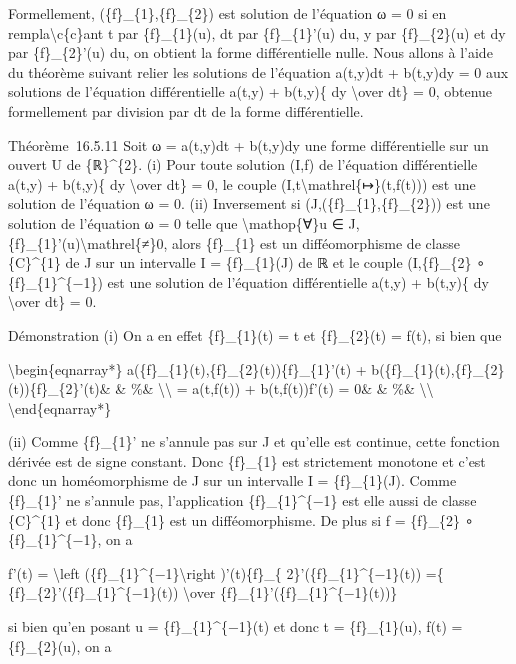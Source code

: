 \documentclass[]{article}
\begin{document}
Formellement, (\{f\}\_\{1\},\{f\}\_\{2\}) est solution de l'équation ω =
0 si en rempla\textbackslash{}c\{c\}ant t par \{f\}\_\{1\}(u), dt par
\{f\}\_\{1\}'(u) du, y par \{f\}\_\{2\}(u) et dy par \{f\}\_\{2\}'(u)
du, on obtient la forme différentielle nulle. Nous allons à l'aide du
théorème suivant relier les solutions de l'équation a(t,y)dt + b(t,y)dy
= 0 aux solutions de l'équation différentielle a(t,y) + b(t,y)\{ dy
\textbackslash{}over dt\} = 0, obtenue formellement par division par dt
de la forme différentielle.

Théorème~16.5.11 Soit ω = a(t,y)dt + b(t,y)dy une forme différentielle
sur un ouvert U de \{ℝ\}\^{}\{2\}. (i) Pour toute solution (I,f) de
l'équation différentielle a(t,y) + b(t,y)\{ dy \textbackslash{}over dt\}
= 0, le couple (I,t\textbackslash{}mathrel\{↦\}(t,f(t))) est une
solution de l'équation ω = 0. (ii) Inversement si
(J,(\{f\}\_\{1\},\{f\}\_\{2\})) est une solution de l'équation ω = 0
telle que \textbackslash{}mathop\{∀\}u ∈
J,\{f\}\_\{1\}'(u)\textbackslash{}mathrel\{≠\}0, alors \{f\}\_\{1\} est
un difféomorphisme de classe \{C\}\^{}\{1\} de J sur un intervalle I =
\{f\}\_\{1\}(J) de ℝ et le couple (I,\{f\}\_\{2\} ∘
\{f\}\_\{1\}\^{}\{−1\}) est une solution de l'équation différentielle
a(t,y) + b(t,y)\{ dy \textbackslash{}over dt\} = 0.

Démonstration (i) On a en effet \{f\}\_\{1\}(t) = t et \{f\}\_\{2\}(t) =
f(t), si bien que

\textbackslash{}begin\{eqnarray*\}
a(\{f\}\_\{1\}(t),\{f\}\_\{2\}(t))\{f\}\_\{1\}'(t) +
b(\{f\}\_\{1\}(t),\{f\}\_\{2\}(t))\{f\}\_\{2\}'(t)\& \& \%\&
\textbackslash{}\textbackslash{} = a(t,f(t)) + b(t,f(t))f'(t) = 0\& \&
\%\& \textbackslash{}\textbackslash{} \textbackslash{}end\{eqnarray*\}

(ii) Comme \{f\}\_\{1\}' ne s'annule pas sur J et qu'elle est continue,
cette fonction dérivée est de signe constant. Donc \{f\}\_\{1\} est
strictement monotone et c'est donc un homéomorphisme de J sur un
intervalle I = \{f\}\_\{1\}(J). Comme \{f\}\_\{1\}' ne s'annule pas,
l'application \{f\}\_\{1\}\^{}\{−1\} est elle aussi de classe
\{C\}\^{}\{1\} et donc \{f\}\_\{1\} est un difféomorphisme. De plus si f
= \{f\}\_\{2\} ∘ \{f\}\_\{1\}\^{}\{−1\}, on a

f'(t) = \textbackslash{}left
(\{f\}\_\{1\}\^{}\{−1\}\textbackslash{}right )'(t)\{f\}\_\{
2\}'(\{f\}\_\{1\}\^{}\{−1\}(t)) =\{
\{f\}\_\{2\}'(\{f\}\_\{1\}\^{}\{−1\}(t)) \textbackslash{}over
\{f\}\_\{1\}'(\{f\}\_\{1\}\^{}\{−1\}(t))\}

si bien qu'en posant u = \{f\}\_\{1\}\^{}\{−1\}(t) et donc t =
\{f\}\_\{1\}(u), f(t) = \{f\}\_\{2\}(u), on a
\end{document}
